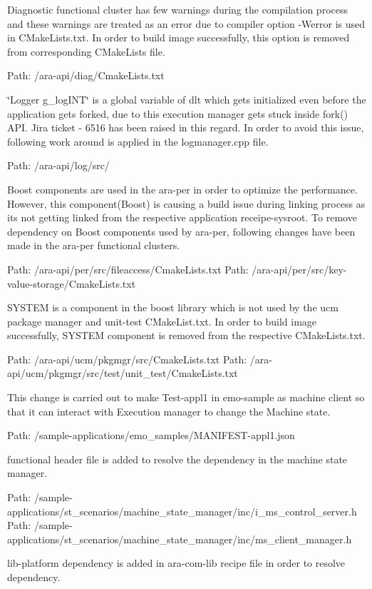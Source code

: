 \begin{DoxyEnumerate}
\item Diagnostic functional cluster has few warnings during the compilation process and these warnings are treated as an error due to compiler option -\/\+Werror is used in C\+Make\+Lists.\+txt. In order to build image successfully, this option is removed from corresponding C\+Make\+Lists file.

Path\+: /ara-\/api/diag/\+Cmake\+Lists.txt 
\item \char`\"{}\+Logger g\+\_\+log\+I\+N\+T\char`\"{} is a global variable of dlt which gets initialized even before the application gets forked, due to this execution manager gets stuck inside fork() A\+PI. Jira ticket -\/ 6516 has been raised in this regard. In order to avoid this issue, following work around is applied in the logmanager.\+cpp file.

Path\+: /ara-\/api/log/src/  
\item Boost components are used in the ara-\/per in order to optimize the performance. However, this component(\+Boost) is causing a build issue during linking process as it\textquotesingle{}s not getting linked from the respective application receipe-\/sysroot. To remove dependency on Boost components used by ara-\/per, following changes have been made in the ara-\/per functional clusters.

Path\+: /ara-\/api/per/src/fileaccess/\+Cmake\+Lists.txt  Path\+: /ara-\/api/per/src/key-\/value-\/storage/\+Cmake\+Lists.txt 
\item S\+Y\+S\+T\+EM is a component in the boost library which is not used by the ucm package manager and unit-\/test C\+Make\+List.\+txt. In order to build image successfully, S\+Y\+S\+T\+EM component is removed from the respective C\+Make\+Lists.\+txt.

Path\+: /ara-\/api/ucm/pkgmgr/src/\+Cmake\+Lists.txt  Path\+: /ara-\/api/ucm/pkgmgr/src/test/unit\+\_\+test/\+Cmake\+Lists.txt 
\item This change is carried out to make Test-\/appl1 in emo-\/sample as machine client so that it can interact with Execution manager to change the Machine state.

Path\+: /sample-\/applications/emo\+\_\+samples/\+M\+A\+N\+I\+F\+E\+S\+T-\/appl1.json 
\item functional header file is added to resolve the dependency in the machine state manager.

Path\+: /sample-\/applications/st\+\_\+scenarios/machine\+\_\+state\+\_\+manager/inc/i\+\_\+ms\+\_\+control\+\_\+server.h  Path\+: /sample-\/applications/st\+\_\+scenarios/machine\+\_\+state\+\_\+manager/inc/ms\+\_\+client\+\_\+manager.h 
\item lib-\/platform dependency is added in ara-\/com-\/lib recipe file in order to resolve dependency.


\end{DoxyEnumerate}
